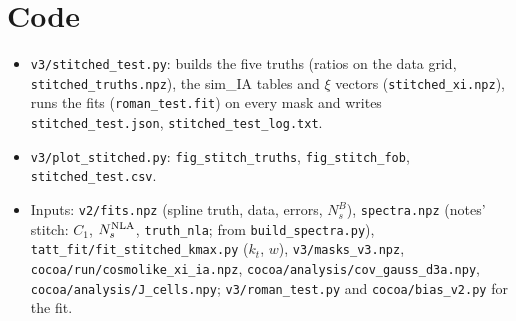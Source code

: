 \documentclass[11pt]{article}
\begin{document}
\section{Code}
\begin{itemize}\sloppy
\item \texttt{v3/stitched\_test.py}: builds the five truths (ratios on the
  data grid, \texttt{stitched\_truths.npz}), the sim\_IA tables and $\xi$
  vectors (\texttt{stitched\_xi.npz}), runs the fits
  (\texttt{roman\_test.fit}) on every mask and writes
  \texttt{stitched\_test.json}, \texttt{stitched\_test\_log.txt}.
\item \texttt{v3/plot\_stitched.py}: \texttt{fig\_stitch\_truths},
  \texttt{fig\_stitch\_fob}, \texttt{stitched\_test.csv}.
\item Inputs: \texttt{v2/fits.npz} (spline truth, data, errors, $N_s^{B}$),
  \texttt{spectra.npz} (notes' stitch: $C_1$, $N_s^{\rm NLA}$,
  \texttt{truth\_nla}; from \texttt{build\_spectra.py}),
  \texttt{tatt\_fit/fit\_stitched\_kmax.py} ($k_t$, $w$),
  \texttt{v3/masks\_v3.npz}, \texttt{cocoa/run/cosmolike\_xi\_ia.npz},
  \texttt{cocoa/analysis/cov\_gauss\_d3a.npy}, \texttt{cocoa/analysis/J\_cells.npy};
  \texttt{v3/roman\_test.py} and \texttt{cocoa/bias\_v2.py} for the fit.
\end{itemize}
\end{document}

